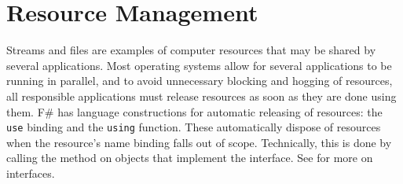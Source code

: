 \documentclass[fsharpNotes.tex]{subfiles}
\begin{document}

\section{Resource Management}
\label{sec:resourceManagement}
Streams and files are examples of computer resources that may be shared by several applications. Most operating systems allow for several applications to be running in parallel, and to avoid unnecessary blocking and hogging of resources, all responsible applications must release resources as soon as they are done using them. F\# has language constructions for automatic releasing of resources: the \lstinline{use} binding and the \lstinline{using} function. These automatically dispose of resources when the resource's name binding falls out of scope. Technically, this is done by calling the  method on objects that implement the  interface. See  for more on interfaces.
\end{document}
